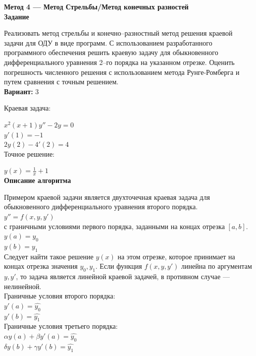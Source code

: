\textbf{Метод 4 --- Метод Стрельбы/Метод конечных разностей}\\

\textbf{Задание}

Реализовать метод стрельбы и конечно--разностный метод решения краевой задачи для ОДУ в виде программ. С использованием разработанного программного обеспечения решить краевую задачу для обыкновенного дифференциального уравнения 2--го порядка на указанном отрезке. Оценить погрешность численного решения с использованием метода Рунге-Ромберга и путем сравнения с точным решением.\\

\textbf{Вариант:} 3

Краевая задача:

$x^2(x+1)y''-2y=0$\\
$y'(1)=-1$\\
$2y(2)-4'(2)=4$\\

Точное решение:

$y(x)=\frac{1}{x}+1$\\

\textbf{Описание алгоритма}

Примером краевой задачи является двухточечная краевая задача для обыкновенного дифференциального уравнения второго порядка.\\

$y''=f(x, y, y')$\\

с граничными условиями первого порядка, заданными на концах отрезка $[a, b]$.\\

$y(a)=y_0$\\
$y(b)=y_1$\\

Следует найти такое решение $y(x)$ на этом отрезке, которое принимает на концах отрезка значения $y_0, y_1$. Если функция $f(x, y, y')$ линейна по аргументам $y, y'$, то задача является линейной краевой задачей, в противном случае --- нелинейной.\\

Граничные условия второго порядка:\\

$y'(a)=\hat{y_0}$\\
$y'(b)=\hat{y_1}$\\

Граничные условия третьего порядка:\\

$\alpha y(a) + \beta y'(a) = \hat{y_0}$\\
$\delta y(b) + \gamma y'(b) = \hat{y_1}$\\

